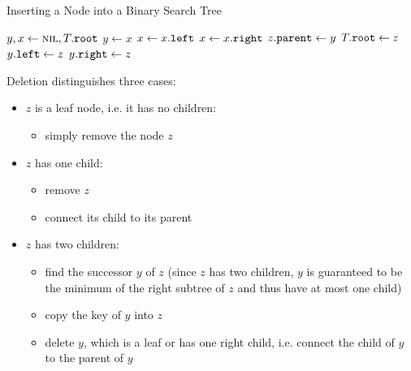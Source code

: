 \begin{algorithm}[htb]
  \caption{Inserting a Node into a Binary Search Tree}
  \label{alg:bst_insert}
  \begin{algorithmic}[1]
      \State $y, x \gets \textsc{nil}, T\mathtt{.}\mathtt{root}$
        \State $y\gets x$
          \State $x\gets x\mathtt{.}\mathtt{left}$
        \Else
          \State $x\gets x\mathtt{.}\mathtt{right}$
        \EndIf
      \EndWhile
      \State $z\mathtt{.}\mathtt{parent}\gets y$
        \State $T\mathtt{.}\mathtt{root}\gets z$
        \State $y\mathtt{.}\mathtt{left}\gets z$
      \Else
        \State $y\mathtt{.}\mathtt{right}\gets z$
      \EndIf
    \EndFunction
  \end{algorithmic}
\end{algorithm}


Deletion distinguishes three cases:
\begin{itemize}[before={\parskip=0pt},nosep]
  \item \(z\) is a leaf node, i.e. it has no children:
    \begin{itemize}[before={\parskip=0pt},nosep]
      \item simply remove the node \(z\)
    \end{itemize}
  \item \(z\) has one child:
    \begin{itemize}[before={\parskip=0pt},nosep]
      \item remove \(z\)
      \item connect its child to its parent
    \end{itemize}
  \item \(z\) has two children:
    \begin{itemize}[before={\parskip=0pt},nosep]
      \item find the successor \(y\) of \(z\) (since \(z\) has two children, \(y\) is guaranteed to be the minimum of the right subtree of \(z\) and thus have at most one child)
      \item copy the key of \(y\) into \(z\)
      \item delete \(y\), which is a leaf or has one right child, i.e. connect the child of \(y\) to the parent of \(y\)
    \end{itemize}
\end{itemize}

